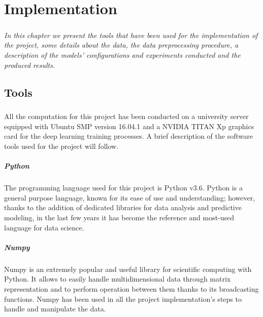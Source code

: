
\chapter{Implementation} \label{chap: implementation}

\paragraph{} \textit{In this chapter we present the tools that have been used for the implementation of the project, some details about the data, the data preprocessing procedure, a description of the models' configurations and experiments conducted and the produced results.}



\section{Tools} \label{sec: tools}
\paragraph{} All the computation for this project has been conducted on a university server equipped with Ubuntu SMP version 16.04.1 and a NVIDIA TITAN Xp graphics card for the deep learning training processes. A brief description of the software tools used for the project will follow.

\paragraph{Python} \cite{python} The programming language used for this project is Python v3.6. Python is a general purpose language, known for its ease of use and understanding; however, thanks to the addition of dedicated libraries for data analysis and predictive modeling, in the last few years it has become the reference and most-used language for data science.

\paragraph{Numpy} \cite{numpy} Numpy is an extremely popular and useful library for scientific computing with Python. It allows to easily handle multidimensional data through matrix representation and to perform operation between them thanks to its broadcasting functions. Numpy has been used in all the project implementation's steps to handle and manipulate the data.

